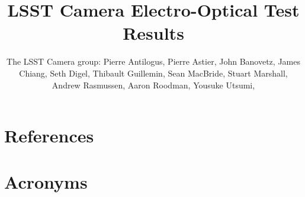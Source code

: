 \documentclass[SE,lsstdraft,authoryear,toc]{lsstdoc}
\title{LSST Camera Electro-Optical Test Results}
\author{%
The LSST Camera group:
Pierre Antilogus,
Pierre Astier,
John Banovetz,
James Chiang,
Seth Digel,
Thibault Guillemin,
Sean MacBride,
Stuart Marshall,
Andrew Rasmussen,
Aaron Roodman,
Yousuke Utsumi,
}
\date{\vcsDate}
\begin{document}
\maketitle


\appendix
\section{References} \label{sec:bib}
%

%


\section{Acronyms} \label{sec:acronyms}

\end{document}
